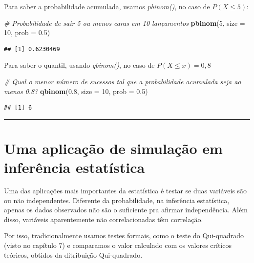 \documentclass[
]{book}
\newenvironment{Shaded}{\begin{snugshade}}{\end{snugshade}}
\newcommand{\AttributeTok}[1]{\textcolor[rgb]{0.13,0.29,0.53}{#1}}
\newcommand{\CommentTok}[1]{\textcolor[rgb]{0.56,0.35,0.01}{\textit{#1}}}
\newcommand{\DecValTok}[1]{\textcolor[rgb]{0.00,0.00,0.81}{#1}}
\newcommand{\FloatTok}[1]{\textcolor[rgb]{0.00,0.00,0.81}{#1}}
\newcommand{\FunctionTok}[1]{\textcolor[rgb]{0.13,0.29,0.53}{\textbf{#1}}}
\newcommand{\NormalTok}[1]{#1}
\begin{document}
Para saber a probabilidade acumulada, usamos \emph{pbinom()}, no caso de \(P(X \leq 5)\):

\begin{Shaded}
\begin{Highlighting}[]
\CommentTok{\# Probabilidade de sair 5 ou menos caras em 10 lançamentos}
\FunctionTok{pbinom}\NormalTok{(}\DecValTok{5}\NormalTok{, }\AttributeTok{size =} \DecValTok{10}\NormalTok{, }\AttributeTok{prob =} \FloatTok{0.5}\NormalTok{)}
\end{Highlighting}
\end{Shaded}

\begin{verbatim}
## [1] 0.6230469
\end{verbatim}

Para saber o quantil, usando \emph{qbinom()}, no caso de \(P(X \leq x) = 0,8\)

\begin{Shaded}
\begin{Highlighting}[]
\CommentTok{\# Qual o menor número de sucessos tal que a probabilidade acumulada seja ao menos 0.8?}
\FunctionTok{qbinom}\NormalTok{(}\FloatTok{0.8}\NormalTok{, }\AttributeTok{size =} \DecValTok{10}\NormalTok{, }\AttributeTok{prob =} \FloatTok{0.5}\NormalTok{)}
\end{Highlighting}
\end{Shaded}

\begin{verbatim}
## [1] 6
\end{verbatim}

\begin{center}\rule{0.5\linewidth}{0.5pt}\end{center}

\section{Uma aplicação de simulação em inferência estatística}\label{uma-aplicauxe7uxe3o-de-simulauxe7uxe3o-em-inferuxeancia-estatuxedstica}

Uma das aplicações mais importantes da estatística é testar se duas variáveis são ou não independentes. Diferente da probabilidade, na inferência estatística, apenas os dados observados não são o suficiente pra afirmar independência. Além disso, variáveis aparentemente não correlacionadas têm correlação.

Por isso, tradicionalmente usamos testes formais, como o teste do Qui-quadrado (visto no capítulo 7) e comparamos o valor calculado com os valores críticos teóricos, obtidos da ditribuição Qui-quadrado.
\end{document}
